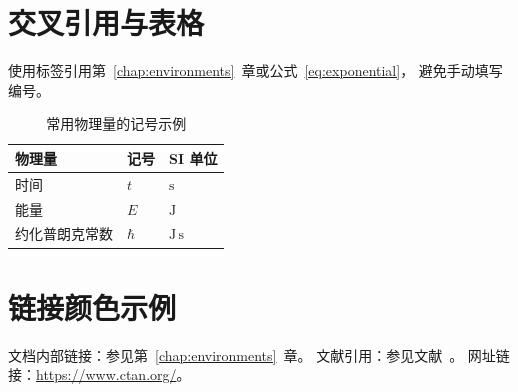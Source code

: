 \section{交叉引用与表格}
使用标签引用第~\ref{chap:environments}~章或公式~\eqref{eq:exponential}，
避免手动填写编号。
\begin{table}[htbp]
  \centering
  \caption{常用物理量的记号示例}
  \label{tab:notation}
  \begin{tabular}{lll}
    \toprule
    物理量 & 记号 & SI 单位\\
    \midrule
    时间 & $t$ & $\mathrm{s}$\\
    能量 & $E$ & $\mathrm{J}$\\
    约化普朗克常数 & $\hbar$ & $\mathrm{J}\,\mathrm{s}$\\
    \bottomrule
  \end{tabular}
\end{table}

\section{链接颜色示例}

文档内部链接：参见第~\ref{chap:environments}~章。 %
文献引用：参见文献~\cite{griffiths2018}。    %
网址链接：\url{https://www.ctan.org/}。       %
